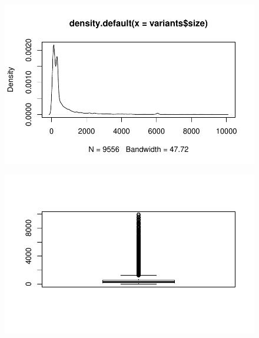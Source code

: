 \documentclass[
  letterpaper,
  DIV=11,
  numbers=noendperiod]{scrreprt}
\newenvironment{Shaded}{\begin{snugshade}}{\end{snugshade}}
\newcommand{\DocumentationTok}[1]{\textcolor[rgb]{0.37,0.37,0.37}{\textit{#1}}}
\newcommand{\FunctionTok}[1]{\textcolor[rgb]{0.28,0.35,0.67}{#1}}
\newcommand{\NormalTok}[1]{\textcolor[rgb]{0.00,0.23,0.31}{#1}}
\newcommand{\SpecialCharTok}[1]{\textcolor[rgb]{0.37,0.37,0.37}{#1}}
\begin{document}
\begin{Shaded}
\end{Shaded}

\begin{figure}[H]

{\centering \includegraphics{scripts/02_dataViz/class3_files/figure-pdf/unnamed-chunk-13-2.pdf}

}

\end{figure}

\begin{Shaded}
\end{Shaded}

\begin{figure}[H]

{\centering \includegraphics{scripts/02_dataViz/class3_files/figure-pdf/unnamed-chunk-13-3.pdf}

}

\end{figure}
\end{document}
